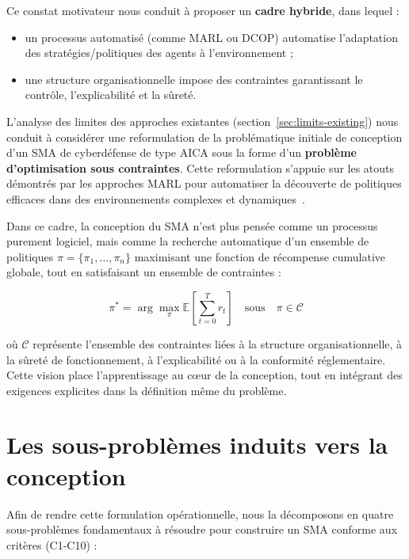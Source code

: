 \documentclass[ twoside,openright,titlepage,numbers=noenddot,headinclude,%
                footinclude=true,cleardoublepage=empty,abstractoff, %
                BCOR=5mm,paper=a4,fontsize=11pt,%
                french,american,%
                ]{scrreprt}
\begin{document}
Ce constat motivateur nous conduit à proposer un \textbf{cadre hybride}, dans lequel :
\begin{itemize}
    \item un processus automatisé (comme MARL ou DCOP) automatise l'adaptation des stratégies/politiques des agents à l'environnement ;
    \item une structure organisationnelle impose des contraintes garantissant le contrôle, l'explicabilité et la sûreté.
\end{itemize}

L'analyse des limites des approches existantes (section~\autoref{sec:limits-existing}) nous conduit à considérer une reformulation de la problématique initiale de conception d'un SMA de cyberdéfense de type AICA sous la forme d'un \textbf{problème d'optimisation sous contraintes}. Cette reformulation s'appuie sur les atouts démontrés par les approches MARL pour automatiser la découverte de politiques efficaces dans des environnements complexes et dynamiques~\cite{Zhang2021survey, Papoudakis2021}.

Dans ce cadre, la conception du SMA n'est plus pensée comme un processus purement logiciel, mais comme la recherche automatique d'un ensemble de politiques \(\pi = \{\pi_1, \dots, \pi_n\}\) maximisant une fonction de récompense cumulative globale, tout en satisfaisant un ensemble de contraintes :

\begin{equation}
    \pi^* = \arg\max_{\pi} \mathbb{E}\left[\sum_{t=0}^{T} r_t\right] \quad \text{sous} \quad \pi \in \mathcal{C}
\end{equation}

où \(\mathcal{C}\) représente l'ensemble des contraintes liées à la structure organisationnelle, à la sûreté de fonctionnement, à l'explicabilité ou à la conformité réglementaire. Cette vision place l'apprentissage au cœur de la conception, tout en intégrant des exigences explicites dans la définition même du problème.

\section{Les sous-problèmes induits vers la conception}

Afin de rendre cette formulation opérationnelle, nous la décomposons en quatre sous-problèmes fondamentaux à résoudre pour construire un SMA conforme aux critères (C1-C10) :
\end{document}
